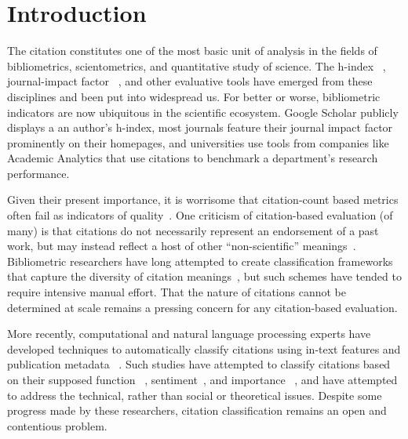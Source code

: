 \documentclass[
10pt, %
a4paper, %
oneside, %
headinclude,footinclude, %
BCOR5mm, %
]{scrartcl}
\begin{document}
\let\thefootnote\relax{}


\newpage %


\section{Introduction}

The citation constitutes one of the most basic unit of analysis in the fields of bibliometrics, scientometrics, and quantitative study of science. The h-index ~\cite{hirsch_index_2005}, journal-impact factor ~\cite{garfield_citation_1955}, and other evaluative tools have emerged from these disciplines and been put into widespread us. For better or worse, bibliometric indicators are now ubiquitous in the scientific ecosystem. Google Scholar publicly displays a an author’s h-index, most journals feature their journal impact factor prominently on their homepages, and universities use tools from companies like Academic Analytics that use citations to benchmark a department’s research performance. 

Given their present importance, it is worrisome that citation-count based metrics often fail as indicators of quality~\cite{leydesdorff_citations:_2016}. One criticism of citation-based evaluation (of many) is that citations do not necessarily represent an endorsement of a past work, but may instead reflect a host of other “non-scientific” meanings~\cite{bornmann_what_2006}. Bibliometric researchers have long attempted to create classification frameworks that capture the diversity of citation meanings~\cite{moravcsik_results_1975}, but such schemes have tended to require intensive manual effort. That the nature of citations cannot be determined at scale remains a pressing concern for any citation-based evaluation.

More recently, computational and natural language processing experts have developed techniques to automatically classify citations using in-text features and publication metadata ~\cite{jha_nlp-driven_2017}. Such studies have attempted to classify citations based on their supposed function ~\cite{teufel_automatic_2006}, sentiment~\cite{catalini_incidence_2015}, and importance ~\cite{valenzuela_identifying_2015}, and have attempted to address the technical, rather than social or theoretical issues. Despite some progress made by these researchers, citation classification remains an open and contentious problem.
\end{document}
